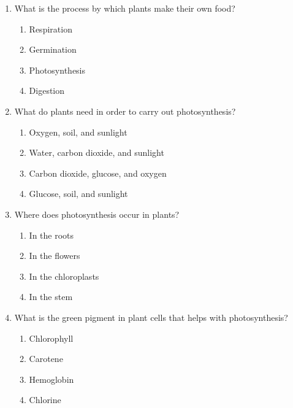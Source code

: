 \documentclass[12pt]{article}
\begin{document}
\begin{enumerate}

    \item What is the process by which plants make their own food?

    \begin{enumerate}[label=\Alph*.]
        \item Respiration
        \item Germination
        \item Photosynthesis
        \item Digestion
    \end{enumerate}
    
    \vspace{0.5cm}

    \item What do plants need in order to carry out photosynthesis?

    \begin{enumerate}[label=\Alph*.]
        \item Oxygen, soil, and sunlight
        \item Water, carbon dioxide, and sunlight
        \item Carbon dioxide, glucose, and oxygen
        \item Glucose, soil, and sunlight
    \end{enumerate}
    
    \vspace{0.5cm}

    \item Where does photosynthesis occur in plants?

    \begin{enumerate}[label=\Alph*.]
        \item In the roots
        \item In the flowers
        \item In the chloroplasts
        \item In the stem
    \end{enumerate}
    
    \vspace{0.5cm}

    \item What is the green pigment in plant cells that helps with photosynthesis?

    \begin{enumerate}[label=\Alph*.]
        \item Chlorophyll
        \item Carotene
        \item Hemoglobin
        \item Chlorine
    \end{enumerate}
    

\end{enumerate}
\end{document}
